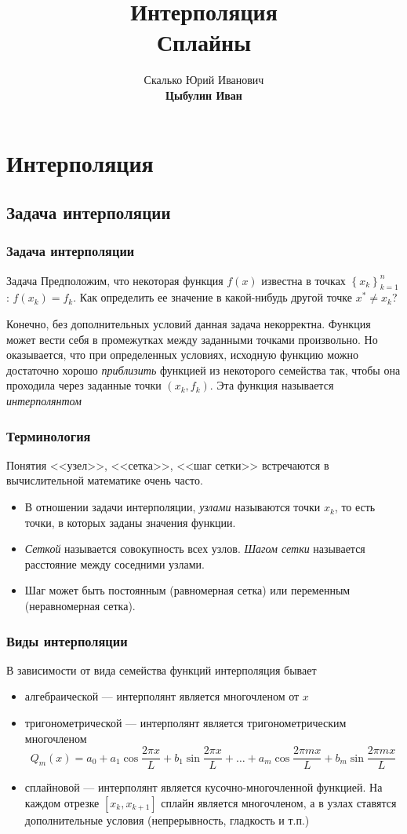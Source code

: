 \documentclass[aspectratio=43,unicode]{beamer}
\title[Интерполяция. Сплайны]{Интерполяция\\Сплайны}
\author[Цыбулин Иван]{Скалько Юрий Иванович\\
\textbf{Цыбулин Иван}}
\date{}
\begin{document}
\begin{frame}[plain]
\titlepage
\end{frame}

\section{Интерполяция}
\subsection{Задача интерполяции}
\begin{frame}
\frametitle{Задача интерполяции}
	\begin{block}{Задача}
	Предположим, что некоторая функция $f(x)$ известна в точках
	$\left\{ x_k \right\}_{k=1}^n$: $f(x_k) = f_k$.
	Как определить ее значение в какой-нибудь другой точке $x^* \neq x_k$?
	\end{block}
	\pause

	Конечно, без дополнительных условий данная задача некорректна. Функция может вести себя
	в промежутках между заданными точками произвольно. Но оказывается, что при определенных условиях,
	исходную функцию можно достаточно хорошо \emph{приблизить} функцией из некоторого семейства так,
	чтобы она проходила через заданные точки $(x_k, f_k)$. Эта функция называется \emph{интерполянтом}
\end{frame}

\begin{frame}
\frametitle{Терминология}
	Понятия <<узел>>, <<сетка>>, <<шаг сетки>> встречаются в вычислительной математике очень часто.
	\begin{itemize}
	\item В отношении задачи интерполяции, \emph{узлами} называются точки $x_k$,
	то есть точки, в которых заданы значения функции.
	\item \emph{Сеткой} называется совокупность всех узлов.
	\emph{Шагом сетки} называется расстояние между соседними узлами.
	\item Шаг может быть постоянным (равномерная сетка) или переменным (неравномерная сетка).
	\end{itemize}
\end{frame}

\begin{frame}
\frametitle{Виды интерполяции}
	В зависимости от вида семейства функций интерполяция бывает
	\begin{itemize}
		\item алгебраической --- интерполянт является многочленом от $x$
		\pause
		\item {тригонометрической --- интерполянт является тригонометрическим многочленом
		\[
			Q_m(x) =
			a_0 + a_1 \cos \frac{2\pi x}{L} + b_1 \sin \frac{2\pi x}{L} + \dots +
			a_m \cos \frac{2\pi mx}{L} + b_m \sin \frac{2\pi mx}{L}
		\]}
		\pause
		\item сплайновой --- интерполянт является кусочно-многочленной функцией. На каждом отрезке $[x_k, x_{k+1}]$ сплайн является многочленом, а
		в узлах ставятся дополнительные условия (непрерывность, гладкость и т.п.)
	\end{itemize}
\end{frame}
\end{document}
